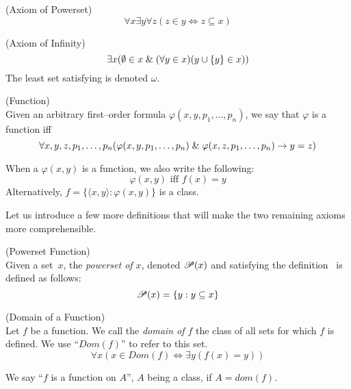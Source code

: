 \begin{definition}{(Axiom of Powerset)}\label{def:powerset}
\begin{equation}
\forall x \exists y \forall z (z \in y \iff z \subseteq x) %
\end{equation}
\end{definition}

\begin{definition}{(Axiom of Infinity)}\label{def:infinity} %
\begin{equation}
\exists x (\emptyset \in x \mathrel{\&} (\forall y \in x)(y\cup\{y\} \in x))\label{eq:axiom_of_infinity}
\end{equation}
The least set satisfying  is denoted $\omega$.
\end{definition}

\begin{definition}{(Function)}\label{def:function}\\
Given an arbitrary first–order formula $\varphi(x, y, p_1, \ldots, p_n)$, we say that $\varphi$ is a function iff
\begin{equation}\label{def:function_formula}
\forall x, y, z, p_1, \ldots, p_n (\varphi(x, y, p_1, \ldots, p_n) \mathrel{\&} \varphi(x, z, p_1, \ldots, p_n) \rightarrow y = z)
\end{equation}
\end{definition}
When a $\varphi(x, y)$ is a function, we also write the following:
\begin{equation}
\varphi(x, y) \mbox{ iff } f(x) = y
\end{equation}
Alternatively, $f = \{\langle x, y \rangle : \varphi(x, y)\}$ is a class.

Let us introduce a few more definitions that will make the two remaining axioms more comprehensible.
\begin{definition}{(Powerset Function)}\\
Given a set~$x$, the \emph{powerset of $x$}, denoted $\mathscr{P} (x)$ and satisfying the definition \, is defined as follows:
\begin{equation}
\mathscr{P} (x) = \{y: y \subseteq x\}
\end{equation}
\end{definition}

\begin{definition}{(Domain of a Function)}\label{def:dom}\\
Let $f$ be a function. We call the \emph{domain of $f$} the class of all sets for which $f$ is defined. We use ``$Dom(f)$'' to refer to this set.
\begin{equation}
\forall x (x \in Dom(f) \iff \exists y (f(x) = y))
\end{equation}
\end{definition}
We say ``$f$ is a function on $A$'', $A$ being a class, if $A = dom(f)$.

